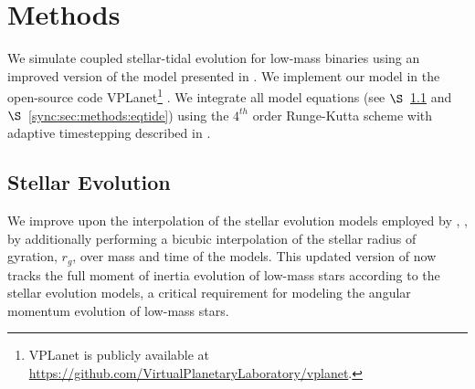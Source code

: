 
\section{Methods} \label{sync:sec:methods}

We simulate coupled stellar-tidal evolution for low-mass binaries using an improved version of the model presented in \citet{Fleming2018}.  We implement our model in the open-source code VPLanet\footnote{VPLanet is publicly available
at \href{https://github.com/VirtualPlanetaryLaboratory/vplanet}{{https://github.com/VirtualPlanetaryLaboratory/vplanet}}.} \citep{Barnes2019}.  We integrate all model equations (see $\S$~\ref{sync:sec:methods:stellar} and $\S$~\ref{sync:sec:methods:eqtide}) using the $4^{th}$ order Runge-Kutta scheme with adaptive timestepping described in \citet{Fleming2018}.  

\subsection{Stellar Evolution} \label{sync:sec:methods:stellar}

We improve upon the interpolation of the \citet{Baraffe2015} stellar evolution models employed by \citet{Fleming2018}, \stellar, by additionally performing a bicubic interpolation of the stellar radius of gyration, $r_g$, over mass and time of the \citet{Baraffe2015} models. This updated version of \stellar now tracks the full moment of inertia evolution of low-mass stars according to the \citet{Baraffe2015} stellar evolution models, a critical requirement for modeling the angular momentum evolution of low-mass stars. 

